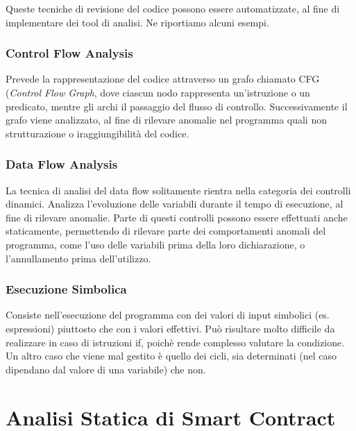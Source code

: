     Queste tecniche di revisione del codice possono essere automatizzate, al fine di implementare dei tool di analisi. Ne riportiamo alcuni esempi.\newline

        \subsubsection{Control Flow Analysis}

        Prevede la rappresentazione del codice attraverso un grafo chiamato CFG (\textit{Control Flow Graph}, dove ciascun nodo rappresenta un'istruzione o un predicato, mentre gli archi il passaggio del flusso di controllo.
        Successivamente il grafo viene analizzato, al fine di rilevare anomalie nel programma quali non strutturazione o iraggiungibilità del codice.\newline
        
        \subsubsection{Data Flow Analysis}
        
        La tecnica di analisi del data flow solitamente rientra nella categoria dei controlli dinamici. 
        Analizza l'evoluzione delle variabili durante il tempo di esecuzione, al fine di rilevare anomalie.
        Parte di questi controlli possono essere effettuati anche staticamente, permettendo di rilevare parte dei comportamenti anomali del programma, come l'uso delle variabili prima della loro dichiarazione, o l'annullamento prima dell'utilizzo.\newline
        
        \subsubsection{Esecuzione Simbolica}
        
        Consiste nell'esecuzione del programma con dei valori di input simbolici (es. espressioni) piuttosto che con i valori effettivi. Può risultare molto difficile da realizzare in caso di istruzioni if, poichè rende complesso valutare la condizione. Un altro caso che viene mal gestito è quello dei cicli, sia determinati (nel caso dipendano dal valore di una variabile) che non.\newline

\section{Analisi Statica di Smart Contract}

